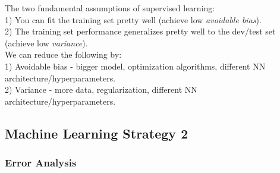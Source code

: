 \documentclass[11pt, a4paper]{article}
\begin{document}
\begin{spacing}{1.1}
	The two fundamental assumptions of supervised learning: \\
	\hspace*{3mm} 1) You can fit the training set pretty well (achieve low \textit{avoidable bias}). \\
	\hspace*{3mm} 2) The training set performance generalizes pretty well to the dev/test set (achieve low \textit{variance}). \vspace*{2mm}\\
	We can reduce the following by: \\
	\hspace*{3mm} 1) Avoidable bias - bigger model, optimization algorithms, different NN architecture/hyperparameters. \\
	\hspace*{3mm} 2) Variance - more data, regularization, different NN architecture/hyperparameters.
	
	\subsection{Machine Learning Strategy 2}
	\subsubsection{Error Analysis}
	
	
	
	
	
	
	
	
	
	
	
	
	
	
	
	
	
	
	
	
	
	
	
	
	
	
	
	
\end{spacing}
\end{document}
